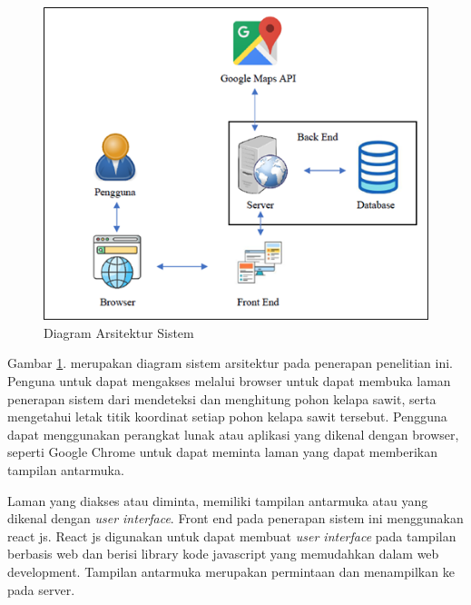 \begin{figure}[H]
	\vspace{-0.1cm}
	\begin{center}
		\includegraphics[width=1\columnwidth]{bab3/Gambar/Picture17.png}
	\end{center}
	\vspace{-0.2cm}
	\captionsetup{justification=centering}
	\caption{Diagram Arsitektur Sistem}\label{img:Diagram-Arsitektur-Sistem}
\end{figure}

Gambar \ref{img:Diagram-Arsitektur-Sistem}. merupakan diagram sistem arsitektur pada penerapan penelitian ini. Penguna untuk dapat mengakses melalui browser untuk dapat membuka laman penerapan sistem dari mendeteksi dan menghitung pohon kelapa sawit, serta mengetahui letak titik koordinat setiap pohon kelapa sawit tersebut. Pengguna dapat menggunakan perangkat lunak atau aplikasi yang dikenal dengan browser, seperti Google Chrome untuk dapat meminta laman yang dapat memberikan tampilan antarmuka.

Laman yang diakses atau diminta, memiliki tampilan antarmuka atau yang dikenal dengan \textit{user interface}. Front end pada penerapan sistem ini menggunakan react js. React js digunakan untuk dapat membuat \textit{user interface} pada tampilan berbasis web dan berisi library kode javascript yang memudahkan dalam web development. Tampilan antarmuka merupakan permintaan dan menampilkan ke pada server.

